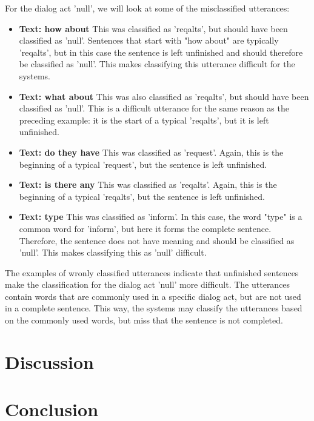 \documentclass{midl} %
\begin{document}
For the dialog act 'null', we will look at some of the misclassified utterances:
\begin{itemize}
  \item \textbf{Text: how about} This was classified as 'reqalts', but should have been classified as 'null'.
        Sentences that start with "how about" are typically 'reqalts', but in this case the sentence is 
        left unfinished and should therefore be classified as 'null'. This makes classifying this utterance difficult for the systems.
  \item \textbf{Text: what about} This was also classified as 'reqalts', but should have been classified as 'null'. This is a 
        difficult utterance for the same reason as the preceding example: it is the start of a typical 'reqalts', but it is left unfinished.
  \item \textbf{Text: do they have} This was classified as 'request'. Again, this is the beginning of a typical 'request', but the sentence is left unfinished.
  \item \textbf{Text: is there any} This was classified as 'reqalts'. Again, this is the beginning of a typical 'reqalts', but the sentence is left unfinished.
  \item \textbf{Text: type} This was classified as 'inform'. In this case, the word "type" is a common word for 'inform', but here it forms the complete sentence. Therefore, the sentence does not have meaning and should be classified as 'null'.
        This makes classifying this as 'null' difficult.
\end{itemize}

The examples of wronly classified utterances indicate that unfinished sentences make the classification for the dialog act 'null' more difficult.
The utterances contain words that are commonly used in a specific dialog act, but are not used in a complete sentence. This way, the systems 
may classify the utterances based on the commonly used words, but miss that the sentence is not completed.


\section{Discussion}

\section{Conclusion}


\end{document}
